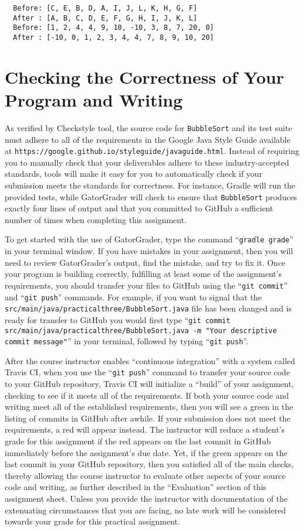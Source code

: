 \documentclass[11pt]{article}
\newcommand{\mainprogram}{\lstinline{BubbleSort}}
\newcommand{\mainprogramsource}{\lstinline{src/main/java/practicalthree/BubbleSort.java}}
\newcommand{\gatorgraderstart}{\command{gradle grade}}
\newcommand{\gitcommit}{\command{git commit}}
\newcommand{\gitpush}{\command{git push}}
\newcommand{\gitcommitmainprogram}{\command{git commit src/main/java/practicalthree/BubbleSort.java -m "Your
descriptive commit message"}}
\newcommand{\command}[1]{``\lstinline{#1}''}
\newcommand{\url}[1]{\lstinline{#1}}
\newcommand{\step}[1]{``{#1}''}
\newcommand{\checkmark}{\ding{51}}
\newcommand{\naughtmark}{\ding{55}}
\begin{document}
\begin{verbatim}
  Before: [C, E, B, D, A, I, J, L, K, H, G, F]
  After : [A, B, C, D, E, F, G, H, I, J, K, L]
  Before: [1, 2, 4, 4, 9, 10, -10, 3, 8, 7, 20, 0]
  After : [-10, 0, 1, 2, 3, 4, 4, 7, 8, 9, 10, 20]
\end{verbatim}

\section*{Checking the Correctness of Your Program and Writing}

As verified by Checkstyle tool, the source code for \mainprogram{} and its test
suite must adhere to all of the requirements in the Google Java Style Guide
available at \url{https://google.github.io/styleguide/javaguide.html}. Instead
of requiring you to manually check that your deliverables adhere to these
industry-accepted standards, tools will make it easy for you to automatically
check if your submission meets the standards for correctness. For instance,
Gradle will run the provided tests, while GatorGrader will check to ensure that
\mainprogram{} produces exactly four lines of output and that you committed to
GitHub a sufficient number of times when completing this assignment.

To get started with the use of GatorGrader, type the command
\gatorgraderstart{} in your terminal window. If you have mistakes in your
assignment, then you will need to review GatorGrader's output, find the
mistake, and try to fix it. Once your program is building correctly, fulfilling
at least some of the assignment's requirements, you should transfer your files
to GitHub using the \gitcommit{} and \gitpush{} commands. For example, if you
want to signal that the \mainprogramsource{} file has been changed and is ready
for transfer to GitHub you would first type \gitcommitmainprogram{} in your
terminal, followed by typing \gitpush{}.

After the course instructor enables \step{continuous integration} with a system
called Travis CI, when you use the \gitpush{} command to transfer your source
code to your GitHub repository, Travis CI will initialize a \step{build} of your
assignment, checking to see if it meets all of the requirements. If both your
source code and writing meet all of the established requirements, then you will
see a green \checkmark{} in the listing of commits in GitHub after awhile. If
your submission does not meet the requirements, a red \naughtmark{} will appear
instead. The instructor will reduce a student's grade for this assignment if the
red \naughtmark{} appears on the last commit in GitHub immediately before the
assignment's due date. Yet, if the green \checkmark{} appears on the last commit
in your GitHub repository, then you satisfied all of the main checks, thereby
allowing the course instructor to evaluate other aspects of your source code and
writing, as further described in the \step{Evaluation} section of this
assignment sheet. Unless you provide the instructor with documentation of the
extenuating circumstances that you are facing, no late work will be considered
towards your grade for this practical assignment.
\end{document}
